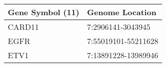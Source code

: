 \begin{tabular}{ll}
\toprule
Gene Symbol (11) &     Genome Location \\
\midrule
          CARD11 &   7:2906141-3043945 \\
            EGFR & 7:55019101-55211628 \\
            ETV1 & 7:13891228-13989946 \\
\bottomrule
\end{tabular}
